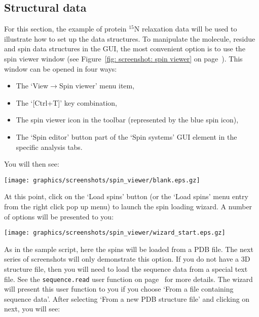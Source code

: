 \subsection{Structural data} \label{sect: GUI - structural data}

For this section, the example of protein $^{15}$N relaxation data will be used to illustrate how to set up the data structures.  To manipulate the molecule, residue and spin data structures in the GUI, the most convenient option is to use the spin viewer window (see Figure~\ref{fig: screenshot: spin viewer} on page~\pageref{fig: screenshot: spin viewer}).  This window can be opened in four ways:

\begin{itemize}
\item The `View$\to$Spin viewer' menu item,
\item The `[Ctrl+T]' key combination,
\item The spin viewer icon in the toolbar (represented by the blue spin icon),
\item The `Spin editor' button part of the `Spin systems' GUI element in the specific analysis tabs.
\end{itemize}

You will then see:

\begin{minipage}[h]{\linewidth}
\centerline{\texttt{[image: graphics/screenshots/spin\_viewer/blank.eps.gz]}}
\label{figure: spin viewer blank}
\end{minipage}

At this point, click on the `Load spins' button (or the `Load spins' menu entry from the right click pop up menu) to launch the spin loading wizard.  A number of options will be presented to you: 

\begin{minipage}[h]{\linewidth}
\centerline{\texttt{[image: graphics/screenshots/spin\_viewer/wizard\_start.eps.gz]}}
\label{figure: spin viewer wizard start}
\end{minipage}

As in the sample script, here the spins will be loaded from a PDB file.  The next series of screenshots will only demonstrate this option.  If you do not have a 3D structure file, then you will need to load the sequence data from a special text file.  See the \texttt{sequence.read} user function on page~\pageref{uf: sequence.read} for more details.  The wizard will present this user function to you if you choose `From a file containing sequence data'.  After selecting `From a new PDB structure file' and clicking on next, you will see:

